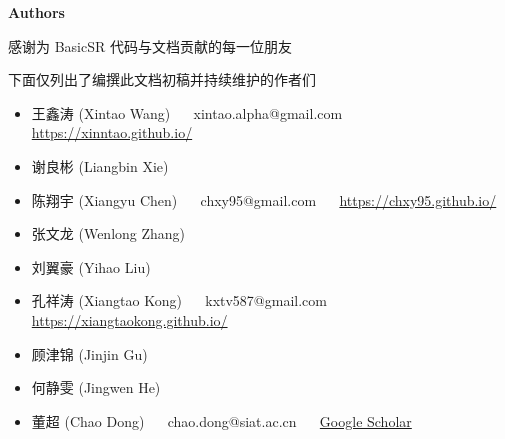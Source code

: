 \documentclass[../main.tex]{subfiles}
\begin{document}
\newpage

{\Large\textbf{Authors}}

感谢为 BasicSR 代码与文档贡献的每一位朋友

下面仅列出了编撰此文档初稿并持续维护的作者们

\begin{itemize}
    \item 王鑫涛 (Xintao Wang) ~~ xintao.alpha@gmail.com ~~ \url{https://xinntao.github.io/}
    \item 谢良彬 (Liangbin Xie)
    \item 陈翔宇 (Xiangyu Chen) ~~ chxy95@gmail.com ~~ \url{https://chxy95.github.io/}
    \item 张文龙 (Wenlong Zhang)
    \item 刘翼豪 (Yihao Liu)
    \item 孔祥涛 (Xiangtao Kong) ~~ kxtv587@gmail.com ~~ \url{https://xiangtaokong.github.io/}
    \item 顾津锦 (Jinjin Gu)
    \item 何静雯 (Jingwen He)
    \item 董超 (Chao Dong) ~~ chao.dong@siat.ac.cn ~~ \href{https://scholar.google.com.hk/citations?user=OSDCB0UAAAAJ}{Google Scholar}
\end{itemize}
\end{document}
